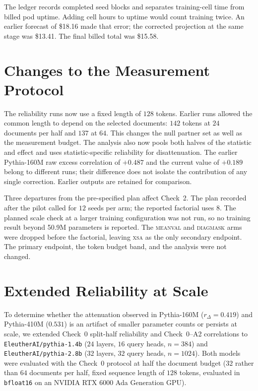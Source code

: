 \documentclass{article} %
\begin{document}
The ledger records completed seed blocks and separates training-cell time
from billed pod uptime. Adding cell hours to uptime would count training
twice. An earlier forecast of \$18.16 made that error; the corrected
projection at the same stage was \$13.41. The final billed total was
\$15.58.

\section{Changes to the Measurement Protocol}
\label{app:deviations}

The reliability runs now use a fixed length of $128$ tokens. Earlier runs
allowed the common length to depend on the selected documents: $142$ tokens
at $24$ documents per half and $137$ at $64$. This changes the null partner
set as well as the measurement budget. The analysis also now pools both
halves of the statistic and effect and uses statistic-specific reliability
for disattenuation. The earlier Pythia-160M raw excess correlation of
$+0.487$ and the current value of $+0.189$ belong to different runs;
their difference does not isolate the contribution of any single correction.
Earlier outputs are retained for comparison.

Three departures from the pre-specified plan affect Check~2. The plan
recorded after the pilot called for $12$ seeds per arm; the reported
factorial uses $8$. The planned scale check at a larger training
configuration was not run, so no training result beyond 50.9M parameters is
reported. The \textsc{meanval} and \textsc{diagmask} arms were dropped
before the factorial, leaving \textsc{xsa} as the only secondary endpoint.
The primary endpoint, the token budget band, and the analysis were not
changed.

\section{Extended Reliability at Scale}
\label{app:extended_reliability}

To determine whether the attenuation observed in Pythia-160M ($r_\Delta = 0.419$) and Pythia-410M ($0.531$) is an artifact of smaller parameter counts or persists at scale, we extended Check~0 split-half reliability and Check~0--A2 correlations to \texttt{EleutherAI/pythia-1.4b} ($24$ layers, $16$ query heads, $n = 384$) and \texttt{EleutherAI/pythia-2.8b} ($32$ layers, $32$ query heads, $n = 1024$). Both models were evaluated with the Check~0 protocol at half the document budget ($32$ rather than $64$ documents per half, fixed sequence length of $128$ tokens, evaluated in \texttt{bfloat16} on an NVIDIA RTX 6000 Ada Generation GPU).
\end{document}
